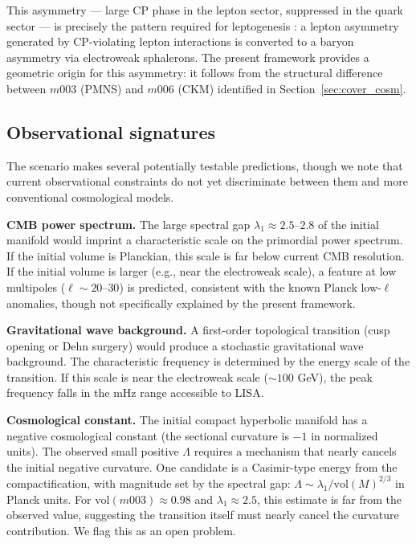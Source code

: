 ﻿\documentclass[12pt]{article}
\theoremstyle{definition}
\begin{document}
This asymmetry --- large CP phase in the lepton sector, suppressed in
the quark sector --- is precisely the pattern required for
leptogenesis \cite{leptogenesis}: a lepton asymmetry generated by
CP-violating lepton interactions is converted to a baryon asymmetry
via electroweak sphalerons. The present framework provides a
geometric origin for this asymmetry: it follows from the structural
difference between $m003$ (PMNS) and $m006$ (CKM) identified in
Section~\ref{sec:cover_cosm}.

\subsection{Observational signatures}

The scenario makes several potentially testable predictions,
though we note that current observational constraints do not yet
discriminate between them and more conventional cosmological models.

\textbf{CMB power spectrum.} The large spectral gap
$\lambda_1 \approx 2.5$--$2.8$ of the initial manifold would
imprint a characteristic scale on the primordial power spectrum.
If the initial volume is Planckian, this scale is far below current
CMB resolution. If the initial volume is larger (e.g., near the
electroweak scale), a feature at low multipoles ($\ell \sim 20$--$30$)
is predicted, consistent with the known Planck low-$\ell$ anomalies,
though not specifically explained by the present framework.

\textbf{Gravitational wave background.} A first-order topological
transition (cusp opening or Dehn surgery) would produce a stochastic
gravitational wave background. The characteristic frequency is
determined by the energy scale of the transition. If this scale is
near the electroweak scale ($\sim 100$ GeV), the peak frequency
falls in the mHz range accessible to LISA.

\textbf{Cosmological constant.} The initial compact hyperbolic
manifold has a negative cosmological constant (the sectional curvature
is $-1$ in normalized units). The observed small positive $\Lambda$
requires a mechanism that nearly cancels the initial negative
curvature. One candidate is a Casimir-type energy from the
compactification, with magnitude set by the spectral gap:
$\Lambda \sim \lambda_1 / \mathrm{vol}(M)^{2/3}$ in Planck units.
For $\mathrm{vol}(m003) \approx 0.98$ and $\lambda_1 \approx 2.5$,
this estimate is far from the observed value, suggesting the
transition itself must nearly cancel the curvature contribution.
We flag this as an open problem.
\end{document}
